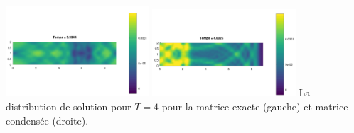 \documentclass[12pt]{article}
\begin{document}
\begin{center}
	\hspace{1cm}\includegraphics[width=0.4\textwidth]{images/T4.png}\hspace{1cm}
	\includegraphics[width=0.4\textwidth]{images/Tcond4.png}\hspace{1cm}
	{La distribution de solution pour $T = 4$ pour la matrice exacte (gauche) et matrice condensée (droite)}.
\end{center}
\end{document}
